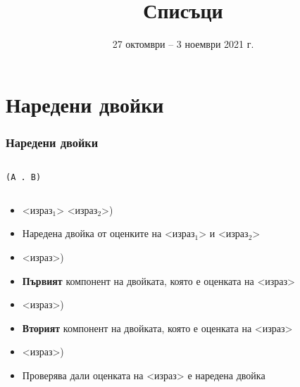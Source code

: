 \documentclass[alsotrans]{beamerswitch}
\title{Списъци}
\date[27.10--3.11.2021 г.]{27 октомври -- 3 ноември 2021 г.}
\begin{document}
\begin{frame}
  \titlepage
\end{frame}

\section{Наредени двойки}

\begin{frame}
  \frametitle{Наредени двойки}

  \begin{columns}[t,onlytextwidth]
    \begin{column}{.5\textwidth}
      \vspace{2ex}
      \begin{center}
        \tt{(A . B)}
      \end{center}
    \end{column}
    \begin{column}{.5\textwidth}
      \begin{center}
      \end{center}
    \end{column}
  \end{columns}
  \pause
  \vspace{2ex}
  \begin{itemize}[<+->]
  \item {} <израз$_1$> <израз$_2$>\tta)
  \item Наредена двойка от оценките на <израз$_1$> и <израз$_2$>
  \item {} <израз>\tta)
  \item \textbf{Първият} компонент на двойката, която е оценката на <израз>
  \item {} <израз>\tta)
  \item \textbf{Вторият} компонент на двойката, която е оценката на <израз>
  \item {}   <израз>\tta)
  \item Проверява дали оценката на <израз> е наредена двойка
  \end{itemize}
\end{frame}
\end{document}

